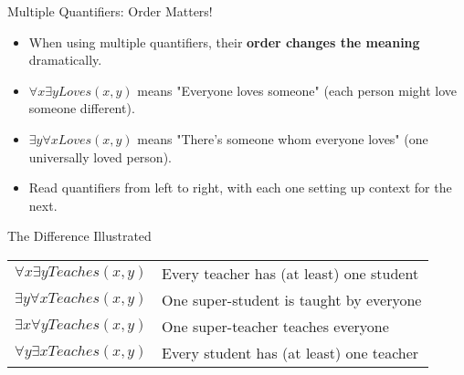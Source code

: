 \documentclass{beamer}
\begin{document}
	\begin{frame}{Multiple Quantifiers: Order Matters!}
		\begin{itemize}
			\item When using multiple quantifiers, their \textbf{order changes the meaning} dramatically.
			\item $\forall x \exists y Loves(x,y)$ means "Everyone loves someone" (each person might love someone different).
			\item $\exists y \forall x Loves(x,y)$ means "There's someone whom everyone loves" (one universally loved person).
			\item Read quantifiers from left to right, with each one setting up context for the next.
		\end{itemize}
		
		\begin{block}{The Difference Illustrated}
			\begin{tabular}{ll}
				$\forall x \exists y Teaches(x,y)$ & Every teacher has (at least) one student \\
				$\exists y \forall x Teaches(x,y)$ & One super-student is taught by everyone \\
				$\exists x \forall y Teaches(x,y)$ & One super-teacher teaches everyone \\
				$\forall y \exists x Teaches(x,y)$ & Every student has (at least) one teacher
			\end{tabular}
		\end{block}
	\end{frame}
	
\end{document}

